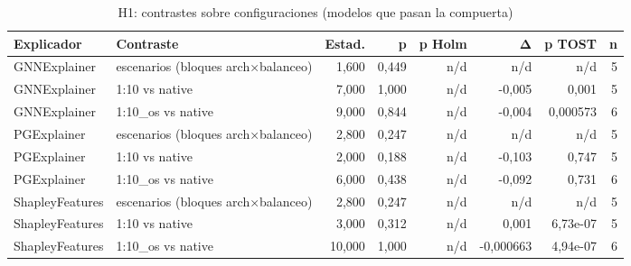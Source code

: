 \begin{table}[htbp]
\centering\small
\caption{H1: contrastes sobre configuraciones (modelos que pasan la compuerta)}
\label{tab:v4-h1}
\begin{tabular}{llrrrrrr}
\toprule
Explicador & Contraste & Estad. & p & p Holm & Δ & p TOST & n \\
\midrule
GNNExplainer & escenarios (bloques arch×balanceo) & 1,600 & 0,449 & n/d & n/d & n/d & 5 \\
GNNExplainer & 1:10 vs native & 7,000 & 1,000 & n/d & -0,005 & 0,001 & 5 \\
GNNExplainer & 1:10\_os vs native & 9,000 & 0,844 & n/d & -0,004 & 0,000573 & 6 \\
PGExplainer & escenarios (bloques arch×balanceo) & 2,800 & 0,247 & n/d & n/d & n/d & 5 \\
PGExplainer & 1:10 vs native & 2,000 & 0,188 & n/d & -0,103 & 0,747 & 5 \\
PGExplainer & 1:10\_os vs native & 6,000 & 0,438 & n/d & -0,092 & 0,731 & 6 \\
ShapleyFeatures & escenarios (bloques arch×balanceo) & 2,800 & 0,247 & n/d & n/d & n/d & 5 \\
ShapleyFeatures & 1:10 vs native & 3,000 & 0,312 & n/d & 0,001 & 6,73e-07 & 5 \\
ShapleyFeatures & 1:10\_os vs native & 10,000 & 1,000 & n/d & -0,000663 & 4,94e-07 & 6 \\
\bottomrule
\end{tabular}
\end{table}
